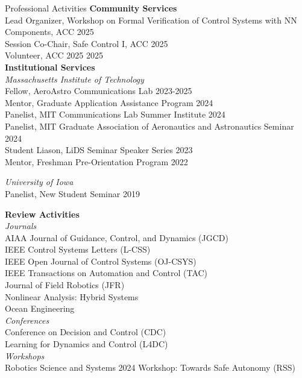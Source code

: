 \begin{rSection}{Professional Activities}
    \textbf{Community Services}\\
    Lead Organizer,  Workshop on Formal Verification of Control Systems with NN Components, ACC \hfill 2025\\
    Session Co-Chair, Safe Control I, ACC \hfill 2025\\
    Volunteer, ACC 2025 \hfill 2025\\


    \textbf{Institutional Services}\\
    \textit{Massachusetts Institute of Technology}\\
    Fellow, AeroAstro Communications Lab \hfill 2023-2025\\
    Mentor, Graduate Application Assistance Program \hfill 2024\\
    Panelist, MIT Communications Lab Summer Institute \hfill 2024\\
    Panelist, MIT Graduate Association of Aeronautics and Astronautics Seminar \hfill 2024\\
    Student Liason, LiDS Seminar Speaker Series \hfill 2023\\
    Mentor, Freshman Pre-Orientation Program \hfill 2022

    \textit{University of Iowa}\\
    Panelist, New Student Seminar \hfill 2019

    
    \textbf{Review Activities}\\
    \textit{Journals}\\
    AIAA Journal of Guidance, Control, and Dynamics (JGCD)\\
    IEEE Control Systems Letters (L-CSS)\\
    IEEE Open Journal of Control Systems (OJ-CSYS)\\
    IEEE Transactions on Automation and Control (TAC)\\
    Journal of Field Robotics (JFR)\\
    Nonlinear Analysis: Hybrid Systems\\
    Ocean Engineering \\

    \textit{Conferences}\\
    Conference on Decision and Control (CDC)\\
    Learning for Dynamics and Control (L4DC)\\

    \textit{Workshops}\\
    Robotics Science and Systems 2024 Workshop: Towards Safe Autonomy (RSS)

\end{rSection}